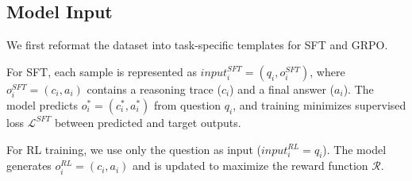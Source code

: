 






\subsection*{Model Input}
We first reformat the dataset into task-specific templates for SFT and GRPO.

For SFT, each sample is represented as $input_i^{SFT}=(q_i,o_i^{SFT})$, where $o_i^{SFT}=(c_i,a_i)$ contains a reasoning trace ($c_i$) and a final answer ($a_i$). The model predicts $o_i^*=(c_i^*,a_i^*)$ from question $q_i$, and training minimizes supervised loss $\mathcal{L}^{SFT}$ between predicted and target outputs.


For RL training, we use only the question as input ($input_i^{RL}=q_i$). The model generates $o_i^{RL}=(c_i,a_i)$ and is updated to maximize the reward function $\mathcal{R}$.



